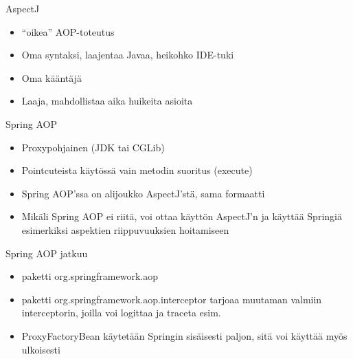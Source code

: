 \documentclass[hyperref={pdfauthor=\AUTHOR},14pt]{beamer}
\begin{document}
\begin{frame}[t, fragile]{AspectJ}
\begin{itemize}
\item ``oikea'' AOP-toteutus
\item Oma syntaksi, laajentaa Javaa, heikohko IDE-tuki
\item Oma kääntäjä
\item Laaja, mahdollistaa aika huikeita asioita
\end{itemize}
\end{frame}

\begin{frame}[t, fragile]{Spring AOP}
\begin{itemize}
\item Proxypohjainen (JDK tai CGLib)
\item Pointcuteista käytössä vain metodin suoritus (execute)
\item Spring AOP'ssa on  alijoukko AspectJ'stä, sama formaatti
\item Mikäli Spring AOP ei riitä, voi ottaa käyttön AspectJ'n ja käyttää Springiä esimerkiksi aspektien riippuvuuksien hoitamiseen
\end{itemize}
\end{frame}

\begin{frame}[t, fragile]{Spring AOP jatkuu}
\begin{itemize}
\item paketti org.springframework.aop
\item paketti org.springframework.aop.interceptor tarjoaa muutaman valmiin interceptorin, joilla voi logittaa ja traceta esim.
\item ProxyFactoryBean käytetään Springin sisäisesti paljon, sitä voi käyttää myös ulkoisesti
\end{itemize}

\end{frame}
\end{document}

